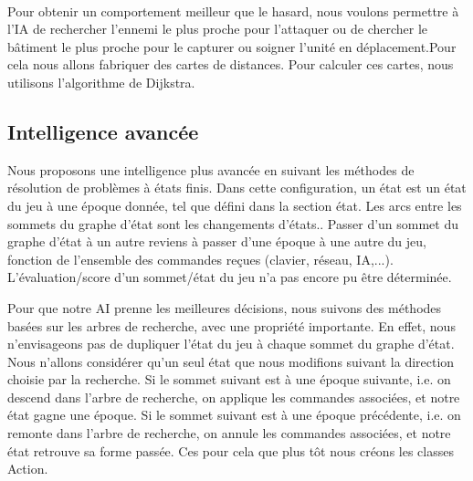\documentclass[12pt]{report}
\begin{document}
\begin{itemize}
\paragraph{}Pour obtenir un comportement meilleur que le hasard, nous voulons permettre à l'IA de rechercher l'ennemi le plus proche pour l'attaquer ou de chercher le bâtiment le plus proche pour le capturer ou soigner l'unité en déplacement.Pour cela nous allons fabriquer des cartes de distances.
Pour calculer ces cartes, nous utilisons l’algorithme de Dijkstra.
\subsection{Intelligence avancée}
\paragraphe{}Nous proposons une intelligence plus avancée en suivant les méthodes de résolution de problèmes à états ﬁnis. Dans cette conﬁguration, un état est un état du jeu à une époque donnée, tel que déﬁni dans la section état. Les arcs entre les sommets du graphe d’état sont les changements d’états.. Passer d’un sommet du graphe d’état à un autre reviens à passer d’une époque à une autre du jeu, fonction de l’ensemble des commandes reçues (clavier, réseau, IA,...). L’évaluation/score d’un sommet/état du jeu n'a pas encore pu être déterminée.

\paragraphe{}Pour que notre AI prenne les meilleures décisions, nous suivons des méthodes basées sur les arbres de recherche, avec une propriété importante. En effet, nous n’envisageons pas de dupliquer l’état du jeu à chaque sommet du graphe d’état. Nous n’allons considérer qu’un seul état que nous modiﬁons suivant la direction choisie par la recherche. Si le sommet suivant est à une époque suivante, i.e. on descend dans l’arbre de recherche, on applique les commandes associées, et notre état gagne une époque. Si le sommet suivant est à une époque précédente, i.e. on remonte dans l’arbre de recherche, on annule les commandes associées, et notre état retrouve sa forme passée. Ces pour cela que plus tôt nous créons les classes Action.



\end{itemize}
\end{document}
